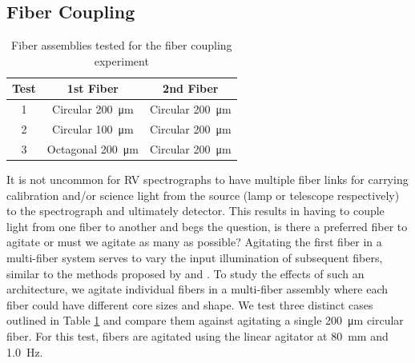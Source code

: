 \documentclass[twocolumn]{emulateapj}
\begin{document}
\subsection{Fiber Coupling}

\begin{table}
\centering
\caption{Fiber assemblies tested for the fiber coupling experiment}
	\begin{tabular}{ccc}
	\hline
	Test & 1st Fiber & 2nd Fiber \\
	\hline \hline
	1 & Circular \SI{200}{\micro\meter} & Circular \SI{200}{\micro\meter} \\
	\hline
	2 & Circular \SI{100}{\micro\meter} & Circular \SI{200}{\micro\meter} \\
	\hline
	3 & Octagonal \SI{200}{\micro\meter} & Circular \SI{200}{\micro\meter} \\
	\hline
	\end{tabular}
\label{table:fiber_coupling}
\end{table}

It is not uncommon for RV spectrographs to have multiple fiber links for carrying calibration and/or science light from the source (lamp or telescope respectively) to the spectrograph and ultimately detector. This results in having to couple light from one fiber to another and begs the question, is there a preferred fiber to agitate or must we agitate as many as possible? Agitating the first fiber in a multi-fiber system serves to vary the input illumination of subsequent fibers, similar to the methods proposed by \citet{Mahadevan2014} and \citet{Halverson2014}. To study the effects of such an architecture, we agitate individual fibers in a multi-fiber assembly where each fiber could have different core sizes and shape. We test three distinct cases outlined in Table \ref{table:fiber_coupling} and compare them against agitating a single \SI{200}{\micro\meter} circular fiber. For this test, fibers are agitated using the linear agitator at \SI{80}{\milli\meter} and \SI{1.0}{\hertz}.
\end{document}
